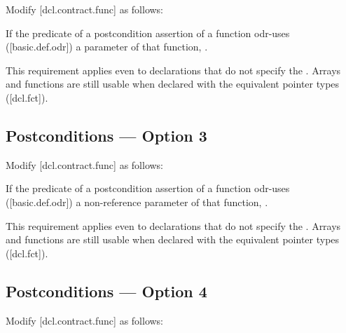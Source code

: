 Modify [dcl.contract.func] as follows:

\begin{adjustwidth}{0.5cm}{0.5cm}
If the predicate of a postcondition assertion of a function odr-uses ([basic.def.odr]) a
parameter of that function, .
\begin{note}
This requirement applies even to declarations
that do not specify the . Arrays and functions are still usable when declared with the equivalent pointer types ([dcl.fct]).
\end{note}
\begin{example}
\tcode{[...]}
\end{example}
\end{adjustwidth}

\subsection*{Postconditions --- Option 3}

Modify [dcl.contract.func] as follows:

\begin{adjustwidth}{0.5cm}{0.5cm}
If the predicate of a postcondition assertion of a function odr-uses ([basic.def.odr]) a
non-reference parameter of that function, .
\begin{note}
This requirement applies even to declarations
that do not specify the . Arrays and functions are still usable when declared with the equivalent pointer types ([dcl.fct]).
\end{note}
\begin{example}
\tcode{[...]}
\end{example}
\end{adjustwidth}

\subsection*{Postconditions --- Option 4}

Modify [dcl.contract.func] as follows:

